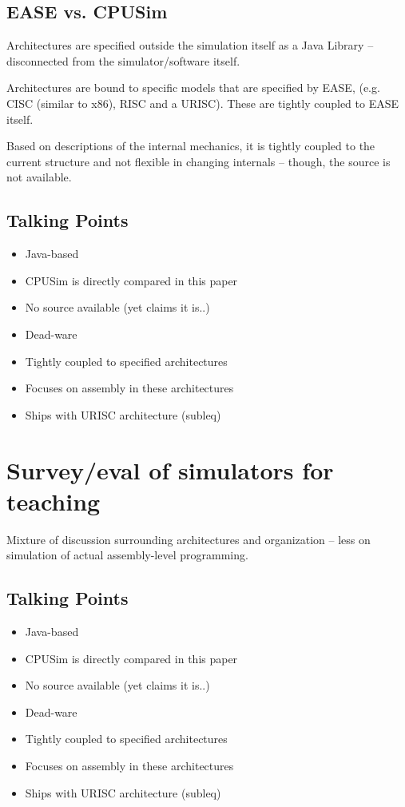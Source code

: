 \subsection{EASE vs. CPUSim}

Architectures are specified outside the simulation itself as a Java Library -- disconnected from the simulator/software itself. 

Architectures are bound to specific models that are specified by EASE, (e.g. CISC (similar to x86), RISC and a URISC). These are tightly coupled to EASE itself. 

Based on descriptions of the internal mechanics, it is tightly coupled to the current structure and not flexible in changing internals -- though, the source is not available. 


\subsection{Talking Points}

\begin{itemize}
\item Java-based
\item CPUSim is directly compared in this paper
\item No source available (yet claims it is..)
\item Dead-ware
\item Tightly coupled to specified architectures
\item Focuses on assembly in these architectures
\item Ships with URISC architecture (subleq)
\end{itemize}

\section{Survey/eval of simulators for teaching}

\cite{Nikolic2009}

Mixture of discussion surrounding architectures and organization -- less on simulation of actual assembly-level programming.  


\subsection{Talking Points}

\begin{itemize}
\item Java-based
\item CPUSim is directly compared in this paper
\item No source available (yet claims it is..)
\item Dead-ware
\item Tightly coupled to specified architectures
\item Focuses on assembly in these architectures
\item Ships with URISC architecture (subleq)
\end{itemize}

